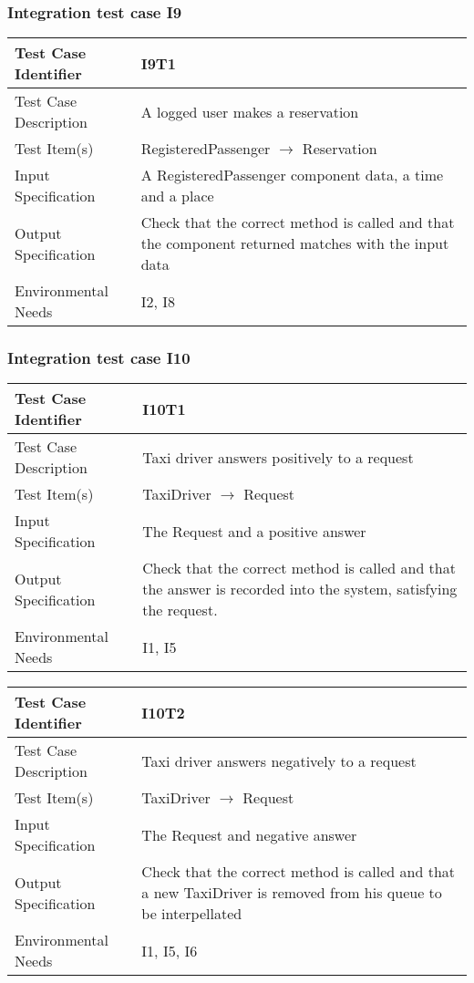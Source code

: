 		\subsubsection{Integration test case I9}
		\begin{center}
			\begin{tabular}{ |l p{10cm}| } \hline
				Test Case Identifier & I9T1 \\ \hline
				Test Case Description & A logged user makes a reservation \\ \hline
				Test Item(s) & RegisteredPassenger $\rightarrow$ Reservation \\ \hline
				Input Specification & A RegisteredPassenger component data, a time and a place \\ \hline
				Output Specification & Check that the correct method is called and that the component returned matches
				with the input data \\ \hline
				Environmental Needs & I2, I8 \\ \hline
			\end{tabular}
		\end{center}
		\subsubsection{Integration test case I10}
		\begin{center}
			\begin{tabular}{ |l p{10cm}| } \hline
				Test Case Identifier & I10T1 \\ \hline
				Test Case Description & Taxi driver answers positively to a request \\ \hline
				Test Item(s) & TaxiDriver $\rightarrow$ Request \\ \hline
				Input Specification & The Request and a positive answer \\ \hline
				Output Specification & Check that the correct method is called and that the answer is recorded
				into the system, satisfying the request. \\ \hline
				Environmental Needs & I1, I5 \\ \hline
			\end{tabular}
			\begin{tabular}{ |l p{10cm}| } \hline
				Test Case Identifier & I10T2 \\ \hline
				Test Case Description & Taxi driver answers negatively to a request \\ \hline
				Test Item(s) & TaxiDriver $\rightarrow$ Request \\ \hline
				Input Specification & The Request and negative answer \\ \hline
				Output Specification & Check that the correct method is called and that a new TaxiDriver is 
				removed from his queue to be interpellated \\ \hline
				Environmental Needs & I1, I5, I6 \\ \hline
			\end{tabular}
		\end{center}
